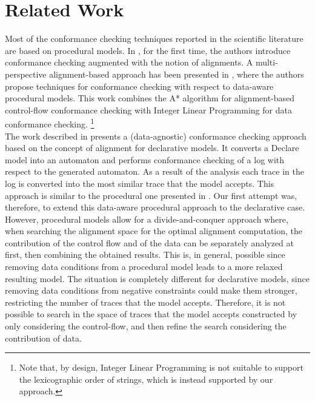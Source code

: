 \section{Related Work}
\label{sec:related}

Most of the conformance checking techniques reported in the scientific literature are based on procedural models. In \cite{DBLP:conf/edoc/AdriansyahDA11}, for the first time, the authors introduce conformance checking augmented with the notion of alignments.
A multi-perspective alignment-based approach has been presented in \cite{MultiPerspective}, where the authors propose techniques for conformance checking with respect to data-aware procedural models. {This work combines the A* algorithm for alignment-based control-flow conformance checking with Integer Linear Programming for data conformance checking.}
\footnote{Note that, by design, Integer Linear Programming is not suitable to support the lexicographic order of strings, which is instead supported by our approach.}
\\
\indent
{The work described in \cite{LeoniMA12} presents a (data-agnostic) conformance checking approach based on the concept of alignment for declarative models. It converts a Declare model into an automaton and performs conformance checking of a log with respect to the generated automaton. As a result of the analysis each trace in the log is converted into the most similar trace that the model accepts. This approach is similar to the procedural one presented in \cite{MultiPerspective}. Our first attempt was, therefore, to extend this data-aware procedural approach to the declarative case. However, procedural models allow for a divide-and-conquer approach where, when searching the alignment space for the optimal alignment computation, the contribution of the control flow and of the data can be separately analyzed at first, then combining the obtained results. This is, in general, possible since removing data conditions from a procedural model leads to a more relaxed resulting model. The situation is completely different for declarative models, since removing data conditions from negative constraints could make them stronger, restricting the number of traces that the model accepts. Therefore, it is not possible to search in the space of traces that the model accepts constructed by only considering the control-flow, and then refine the search considering the contribution of data.}
